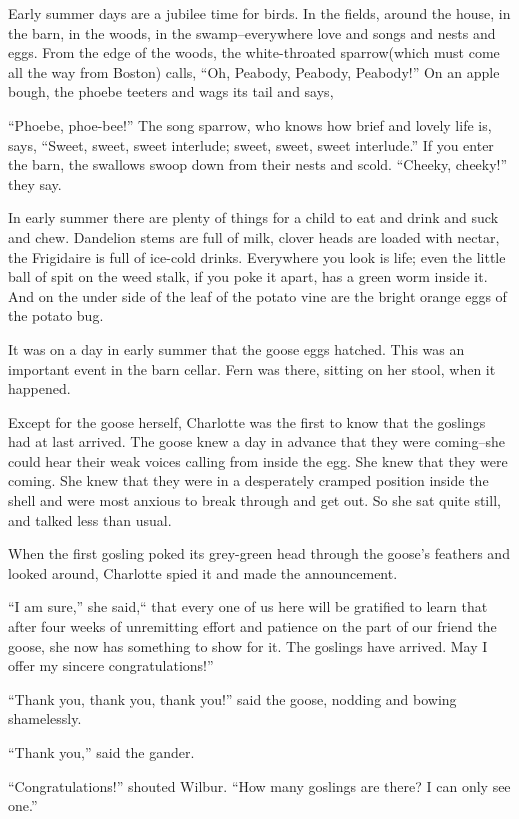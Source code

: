 \documentclass[a4paper, oneside]{book}
\begin{document}
 Early summer days are a jubilee time for birds. In the fields,
around the house, in the barn, in the woods, in the
swamp--everywhere love and songs and nests and eggs. From the
edge of the woods, the white-throated sparrow(which must come
all the way from Boston) calls, ``Oh, Peabody, Peabody, Peabody!''
On an apple bough, the phoebe teeters and wags its tail and says,

``Phoebe, phoe-bee!'' The song sparrow, who knows how brief and
lovely life is, says, ``Sweet, sweet, sweet interlude; sweet, sweet,
sweet interlude.'' If you enter the barn, the swallows swoop down
from their nests and scold. ``Cheeky, cheeky!'' they say.

 In early summer there are plenty of things for a child to eat and       
drink and suck and chew. Dandelion stems are full of milk, clover
heads are loaded with nectar, the Frigidaire is full of ice-cold
drinks. Everywhere you look is life; even the little ball of spit on the
weed stalk, if you poke it apart, has a green worm inside it. And on
the under side of the leaf of the potato vine are the bright orange
eggs of the potato bug. 

 It was on a day in early summer that the goose eggs hatched. This
was an important event in the barn cellar. Fern was there, sitting
on her stool, when it happened.

 Except for the goose herself, Charlotte was the first to know that
the goslings had at last arrived. The goose knew a day in advance
that they were coming--she could hear their weak voices calling
from inside the egg. She knew that they were coming. She knew
that they were in a desperately cramped position inside the shell
and were most anxious to break through and get out. So she sat
quite still, and talked less than usual.

 When the first gosling poked its grey-green head through the
goose's feathers and looked around, Charlotte spied it and made
the announcement.

 ``I am sure,'' she said,`` that every one of us here will be gratified to
learn that after four weeks of unremitting effort and patience on
the part of our friend the goose, she now has something to show for 
it. The goslings have arrived. May I offer my sincere
congratulations!'' 

``Thank you, thank you, thank you!'' said the goose, nodding and
bowing shamelessly.

 ``Thank you,'' said the gander.

 ``Congratulations!'' shouted Wilbur. ``How many goslings are
there? I can only see one.''
\end{document}
